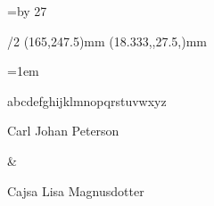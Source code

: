 \fontfam[berlingnova]



\typosize[10.5/15.3]


\svlang

\hsize=110mm
\vsize=\topskip \advance\vsize by 27\baselineskip\relax

\margins/2 (165,247.5)mm (18.333,,27.5,)mm

\parskip=0pt
\parindent=1em

\baselineskip

\def\hairspace		{\hskip\dimexpr(1em/24)\relax}
\def\thinspace		{\hskip\dimexpr(1em/8)\relax}
\def\sixthspace		{\hskip\dimexpr(1em/6)\relax}
\def\quarterspace	{\hskip\dimexpr(1em/4)\relax}
\def\enspace		{\hskip\dimexpr(1em/2)\relax}
\def\emspace		{\hskip\dimexpr(1em)\relax}

\def\capspace		{\hskip\dimexpr(1em/14)\relax}

\hbox{abcdefghijklmnopqrstuvwxyz}
\the{}


{%
	\typosize[14.4/]
	\it
	\centerline{Carl Johan Peterson}
	\baselineskip
	\centerline{\rm \&}
	\baselineskip
	\centerline{Cajsa Lisa Magnusdotter}
}
\baselineskip

